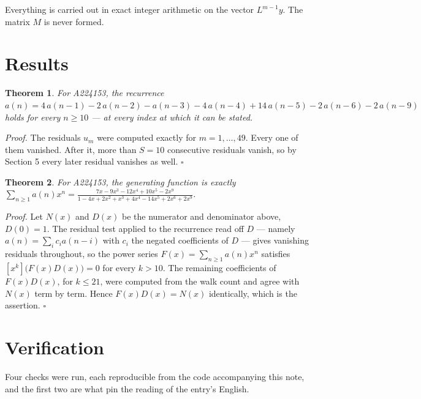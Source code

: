 \documentclass[11pt]{article}
\newtheorem{theorem}{Theorem}
\theoremstyle{definition}
\begin{document}
Everything is carried out in exact integer arithmetic on the vector $L^{m-1}y$. The matrix $M$ is never formed.

\section{Results}

\begin{theorem} For A224153, the recurrence $a(n) = 4\,a(n-1) - 2\,a(n-2) - a(n-3) - 4\,a(n-4) + 14\,a(n-5) - 2\,a(n-6) - 2\,a(n-9)$ holds for every $n \ge 10$ --- at every index at which it can be stated.\end{theorem}

{\itshape Proof.} The residuals $u_m$ were computed exactly for $m = 1,\dots,49$. Every one of them vanished. After it, more than $S = 10$ consecutive residuals vanish, so by Section 5 every later residual vanishes as well. $\square$

\begin{theorem} For A224153, the generating function is exactly $\sum_{n\ge 1} a(n)x^n = \frac{7x - 9x^{3} - 12x^{4} + 10x^{5} - 2x^{9}}{1 - 4x + 2x^{2} + x^{3} + 4x^{4} - 14x^{5} + 2x^{6} + 2x^{9}}$.\end{theorem}

{\itshape Proof.} Let $N(x)$ and $D(x)$ be the numerator and denominator above, $D(0)=1$. The residual test applied to the recurrence read off $D$ --- namely $a(n) = \sum_i c_i a(n-i)$ with $c_i$ the negated coefficients of $D$ --- gives vanishing residuals throughout, so the power series $F(x)=\sum_{n\ge 1}a(n)x^n$ satisfies $[x^k]\bigl(F(x)D(x)\bigr) = 0$ for every $k > 10$. The remaining coefficients of $F(x)D(x)$, for $k \le 21$, were computed from the walk count and agree with $N(x)$ term by term. Hence $F(x)D(x) = N(x)$ identically, which is the assertion. $\square$

\section{Verification}

Four checks were run, each reproducible from the code accompanying this note, and the first two are what pin the reading of the entry's English.
\end{document}
